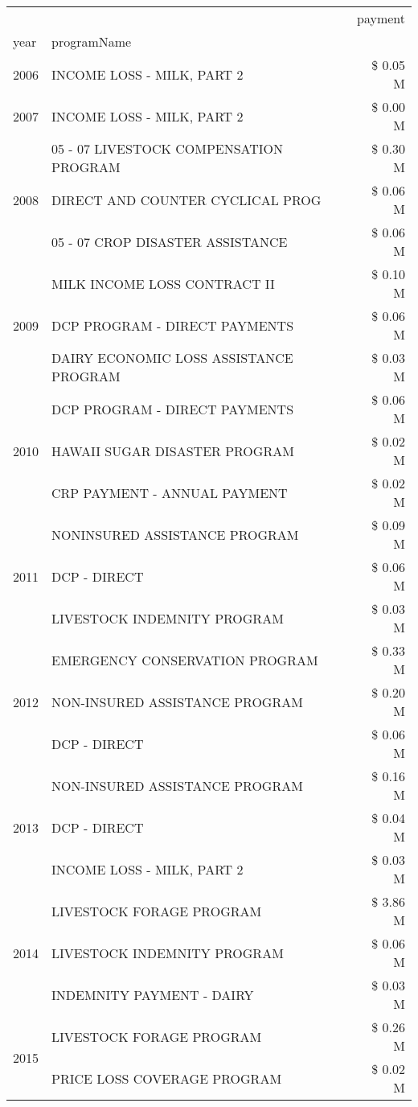 \begin{tabular}{llr}
\toprule
 &  & payment \\
year & programName &  \\
\midrule
2006 & INCOME LOSS - MILK, PART 2 & \$ 0.05 M \\
\cline{1-3}
2007 & INCOME LOSS - MILK, PART 2 & \$ 0.00 M \\
\cline{1-3}
\multirow[t]{3}{*}{2008} & 05 - 07 LIVESTOCK COMPENSATION PROGRAM & \$ 0.30 M \\
 & DIRECT AND COUNTER CYCLICAL PROG & \$ 0.06 M \\
 & 05 - 07 CROP DISASTER ASSISTANCE & \$ 0.06 M \\
\cline{1-3}
\multirow[t]{3}{*}{2009} & MILK INCOME LOSS CONTRACT II & \$ 0.10 M \\
 & DCP PROGRAM - DIRECT PAYMENTS & \$ 0.06 M \\
 & DAIRY ECONOMIC LOSS ASSISTANCE PROGRAM & \$ 0.03 M \\
\cline{1-3}
\multirow[t]{3}{*}{2010} & DCP PROGRAM - DIRECT PAYMENTS & \$ 0.06 M \\
 & HAWAII SUGAR DISASTER PROGRAM & \$ 0.02 M \\
 & CRP PAYMENT - ANNUAL PAYMENT & \$ 0.02 M \\
\cline{1-3}
\multirow[t]{3}{*}{2011} & NONINSURED ASSISTANCE PROGRAM & \$ 0.09 M \\
 & DCP - DIRECT & \$ 0.06 M \\
 & LIVESTOCK INDEMNITY PROGRAM & \$ 0.03 M \\
\cline{1-3}
\multirow[t]{3}{*}{2012} & EMERGENCY CONSERVATION PROGRAM & \$ 0.33 M \\
 & NON-INSURED ASSISTANCE PROGRAM & \$ 0.20 M \\
 & DCP - DIRECT & \$ 0.06 M \\
\cline{1-3}
\multirow[t]{3}{*}{2013} & NON-INSURED ASSISTANCE PROGRAM & \$ 0.16 M \\
 & DCP - DIRECT & \$ 0.04 M \\
 & INCOME LOSS - MILK, PART 2 & \$ 0.03 M \\
\cline{1-3}
\multirow[t]{3}{*}{2014} & LIVESTOCK FORAGE PROGRAM & \$ 3.86 M \\
 & LIVESTOCK INDEMNITY PROGRAM & \$ 0.06 M \\
 & INDEMNITY PAYMENT - DAIRY & \$ 0.03 M \\
\cline{1-3}
\multirow[t]{3}{*}{2015} & LIVESTOCK FORAGE PROGRAM & \$ 0.26 M \\
 & PRICE LOSS COVERAGE PROGRAM & \$ 0.02 M \\

\end{tabular}
